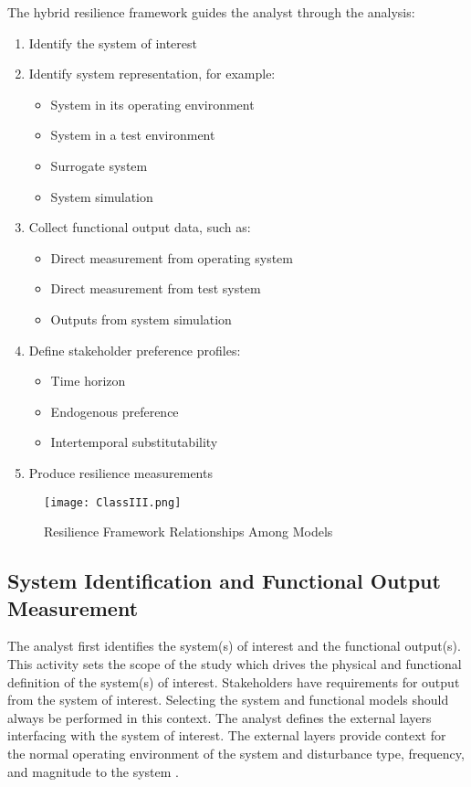 The hybrid resilience framework guides the analyst through the analysis:
\begin{enumerate}
  \item Identify the system of interest
  \item Identify system representation, for example:
    \begin{itemize}
    \item System in its operating environment
    \item System in a test environment
    \item Surrogate system
    \item System simulation
    \end{itemize}
  \item Collect functional output data, such as:
    \begin{itemize}
    \item Direct measurement from operating system
    \item Direct measurement from test system
    \item Outputs from system simulation
    \end{itemize}
  \item Define stakeholder preference profiles:
    \begin{itemize}
    \item Time horizon
    \item Endogenous preference
    \item Intertemporal substitutability
    \end{itemize}
  \item Produce resilience measurements
\end{enumerate}


\begin{figure}[h]
  \centering\texttt{[image: ClassIII.png]}
  \caption{Resilience Framework Relationships Among Models}
  \label{f:ResilienceFramework}
\end{figure}

\subsection{System Identification and Functional Output Measurement}
The analyst first identifies the system(s) of interest and the
functional output(s). This activity sets the scope of the
study which drives the physical and functional definition of the
system(s) of interest. Stakeholders have requirements for output from the
system of interest. Selecting the system and functional models should
always be performed in this context. The analyst defines the external
layers interfacing with the system of interest. The external layers
provide context for the normal operating environment of the system and
disturbance type, frequency, and magnitude to the system \cite{APL2015}.

